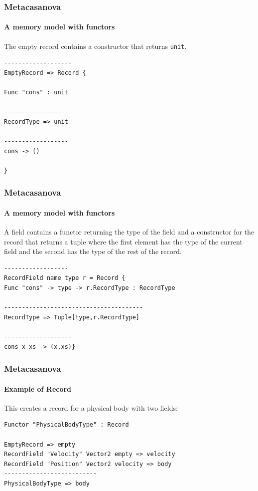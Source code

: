 \documentclass[10pt,a4paper]{beamer}
\begin{document}
\begin{frame}[fragile]
\frametitle{Metacasanova}
\framesubtitle{A memory model with functors}

The empty record contains a constructor that returns \texttt{unit}.

\begin{lstlisting}
-------------------
EmptyRecord => Record {

Func "cons" : unit

------------------
RecordType => unit

------------------
cons -> ()

}
\end{lstlisting}

\end{frame}

\begin{frame}[fragile]
\frametitle{Metacasanova}
\framesubtitle{A memory model with functors}

A field contains a functor returning the type of the field and a constructor for the record that returns a tuple where the first element has the type of the current field and the second has the type of the rest of the record.

\begin{lstlisting}
------------------
RecordField name type r = Record {
Func "cons" -> type -> r.RecordType : RecordType

---------------------------------------
RecordType => Tuple[type,r.RecordType]

-------------------
cons x xs -> (x,xs)} 
\end{lstlisting}
\end{frame}

\begin{frame}[fragile]
\frametitle{Metacasanova}
\framesubtitle{Example of Record}

This creates a record for a physical body with two fields:

\begin{lstlisting}
Functor "PhysicalBodyType" : Record

EmptyRecord => empty
RecordField "Velocity" Vector2 empty => velocity
RecordField "Position" Vector2 velocity => body
--------------------------
PhysicalBodyType => body
\end{lstlisting}

\end{frame}
\end{document}
